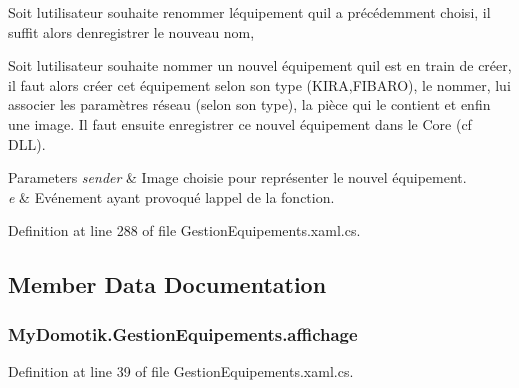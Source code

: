 \begin{DoxyItemize}
\item Soit l\textquotesingle{}utilisateur souhaite renommer l\textquotesingle{}équipement qu\textquotesingle{}il a précédemment choisi, il suffit alors d\textquotesingle{}enregistrer le nouveau nom, ~\newline

\item Soit l\textquotesingle{}utilisateur souhaite nommer un nouvel équipement qu\textquotesingle{}il est en train de créer, il faut alors créer cet équipement selon son type (K\+I\+RA,F\+I\+B\+A\+RO), le nommer, lui associer les paramètres réseau (selon son type), la pièce qui le contient et enfin une image. Il faut ensuite enregistrer ce nouvel équipement dans le Core (cf D\+LL). 
\end{DoxyItemize}


\begin{DoxyParams}{Parameters}
{\em sender} & Image choisie pour représenter le nouvel équipement.\\
\hline
{\em e} & Evénement ayant provoqué l\textquotesingle{}appel de la fonction.\\
\hline
\end{DoxyParams}


Definition at line 288 of file Gestion\+Equipements.\+xaml.\+cs.



\subsection{Member Data Documentation}
\subsubsection[{\texorpdfstring{affichage}{affichage}}]{ My\+Domotik.\+Gestion\+Equipements.\+affichage\hspace{0.3cm}{\ttfamily [private]}}\hypertarget{class_my_domotik_1_1_gestion_equipements_a0b38f0169712b6eb70f54669c2f06b45}{}\label{class_my_domotik_1_1_gestion_equipements_a0b38f0169712b6eb70f54669c2f06b45}


Definition at line 39 of file Gestion\+Equipements.\+xaml.\+cs.

